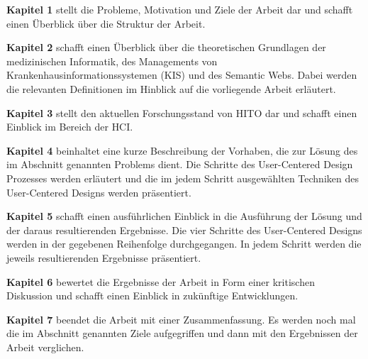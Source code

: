 \textbf{Kapitel 1} stellt die Probleme, Motivation und Ziele der Arbeit dar und schafft einen Überblick über die Struktur der Arbeit. \newline

\textbf{Kapitel 2} schafft einen Überblick über die theoretischen Grundlagen der medizinischen Informatik, des Managements von Krankenhausinformationssystemen (KIS) und  des Semantic Webs. Dabei werden die relevanten Definitionen im Hinblick auf die vorliegende Arbeit erläutert.  \newline

\textbf{Kapitel 3} stellt den aktuellen Forschungsstand von HITO dar und schafft einen Einblick im Bereich der \ac{HCI}. \newline

\textbf{Kapitel 4} beinhaltet eine kurze Beschreibung der Vorhaben, die zur Lösung des im Abschnitt  genannten Problems dient. 
Die Schritte des User-Centered Design Prozesses werden erläutert und die im jedem Schritt ausgewählten Techniken des User-Centered Designs werden präsentiert. \newline

\textbf{Kapitel 5} schafft einen ausführlichen Einblick in die Ausführung der Lösung und der daraus resultierenden Ergebnisse. 
Die vier Schritte des User-Centered Designs werden in der gegebenen Reihenfolge durchgegangen.
In jedem Schritt werden die jeweils resultierenden Ergebnisse präsentiert. \newline

\textbf{Kapitel 6} bewertet die Ergebnisse der Arbeit in Form einer kritischen Diskussion und schafft einen Einblick in zukünftige Entwicklungen. \newline

\textbf{Kapitel 7} beendet die Arbeit mit einer Zusammenfassung. Es werden noch mal die im Abschnitt  genannten Ziele aufgegriffen und dann mit den Ergebnissen der Arbeit verglichen.



